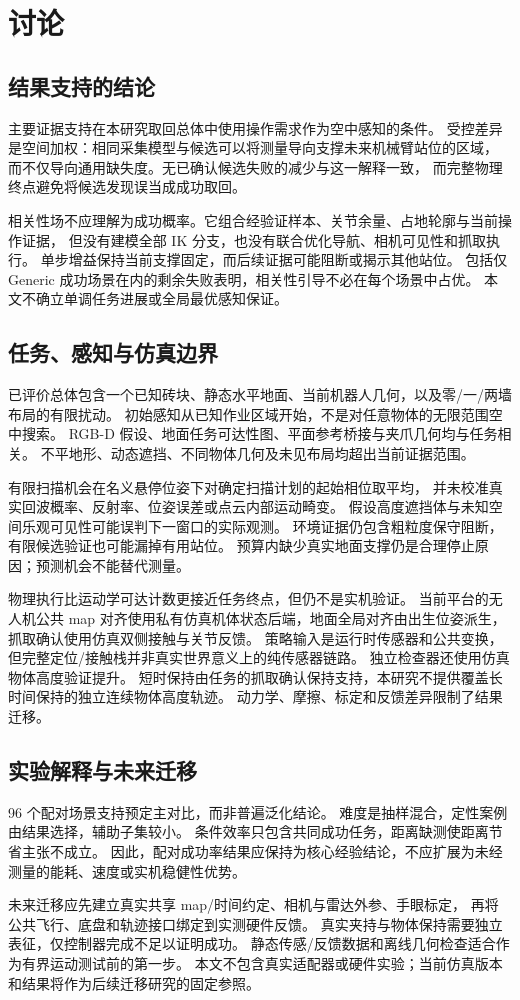 \section{讨论}
\label{sec:discussion}
\subsection{结果支持的结论}
主要证据支持在本研究取回总体中使用操作需求作为空中感知的条件。
受控差异是空间加权：相同采集模型与候选可以将测量导向支撑未来机械臂站位的区域，
而不仅导向通用缺失度。无已确认候选失败的减少与这一解释一致，
而完整物理终点避免将候选发现误当成成功取回。

相关性场不应理解为成功概率。它组合经验证样本、关节余量、占地轮廓与当前操作证据，
但没有建模全部 IK 分支，也没有联合优化导航、相机可见性和抓取执行。
单步增益保持当前支撑固定，而后续证据可能阻断或揭示其他站位。
包括仅 Generic 成功场景在内的剩余失败表明，相关性引导不必在每个场景中占优。
本文不确立单调任务进展或全局最优感知保证。

\subsection{任务、感知与仿真边界}
\label{sec:limitations}
已评价总体包含一个已知砖块、静态水平地面、当前机器人几何，以及零/一/两墙布局的有限扰动。
初始感知从已知作业区域开始，不是对任意物体的无限范围空中搜索。
RGB-D 假设、地面任务可达性图、平面参考桥接与夹爪几何均与任务相关。
不平地形、动态遮挡、不同物体几何及未见布局均超出当前证据范围。

有限扫描机会在名义悬停位姿下对确定扫描计划的起始相位取平均，
并未校准真实回波概率、反射率、位姿误差或点云内部运动畸变。
假设高度遮挡体与未知空间乐观可见性可能误判下一窗口的实际观测。
环境证据仍包含粗粒度保守阻断，有限候选验证也可能漏掉有用站位。
预算内缺少真实地面支撑仍是合理停止原因；预测机会不能替代测量。

物理执行比运动学可达计数更接近任务终点，但仍不是实机验证。
当前平台的无人机公共 map 对齐使用私有仿真机体状态后端，地面全局对齐由出生位姿派生，
抓取确认使用仿真双侧接触与关节反馈。
策略输入是运行时传感器和公共变换，但完整定位/接触栈并非真实世界意义上的纯传感器链路。
独立检查器还使用仿真物体高度验证提升。
短时保持由任务的抓取确认保持支持，本研究不提供覆盖长时间保持的独立连续物体高度轨迹。
动力学、摩擦、标定和反馈差异限制了结果迁移。

\subsection{实验解释与未来迁移}
96 个配对场景支持预定主对比，而非普遍泛化结论。
难度是抽样混合，定性案例由结果选择，辅助子集较小。
条件效率只包含共同成功任务，距离缺测使距离节省主张不成立。
因此，配对成功率结果应保持为核心经验结论，不应扩展为未经测量的能耗、速度或实机稳健性优势。

未来迁移应先建立真实共享 map/时间约定、相机与雷达外参、手眼标定，
再将公共飞行、底盘和轨迹接口绑定到实测硬件反馈。
真实夹持与物体保持需要独立表征，仅控制器完成不足以证明成功。
静态传感/反馈数据和离线几何检查适合作为有界运动测试前的第一步。
本文不包含真实适配器或硬件实验；当前仿真版本和结果将作为后续迁移研究的固定参照。
